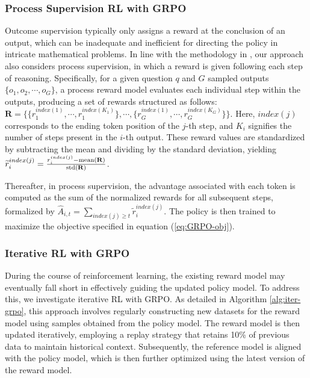 \begin{itemize}[topsep=0pt]
\begin{itemize}[topsep=0pt]
\subsubsection{Process Supervision RL with GRPO}

Outcome supervision typically only assigns a reward at the conclusion of an output, which can be inadequate and inefficient for directing the policy in intricate mathematical problems. In line with the methodology in \cite{wang2023math}, our approach also considers process supervision, in which a reward is given following each step of reasoning. Specifically, for a given question $q$ and $G$ sampled outputs $\{o_1, o_2, \cdots, o_G\}$, a process reward model evaluates each individual step within the outputs, producing a set of rewards structured as follows: $\mathbf{R} = \{ \{r_1^{index(1)},\cdots,r_1^{index(K_1)}\}, \cdots,  \{r_G^{index(1)},\cdots,r_G^{index(K_G)}\} \}$. Here, $index(j)$ corresponds to the ending token position of the $j$-th step, and $K_i$ signifies the number of steps present in the $i$-th output. These reward values are standardized by subtracting the mean and dividing by the standard deviation, yielding $\widetilde{r}_i^{index(j)} = \frac{r_i^{index(j)} - {\rm mean(\mathbf{R})}}{{\rm std(\mathbf{R})}}$.

Thereafter, in process supervision, the advantage associated with each token is computed as the sum of the normalized rewards for all subsequent steps, formalized by $\hat{A}_{i, t} = \sum_{index(j) \ge t} \widetilde{r}_i^{index(j)}$. The policy is then trained to maximize the objective specified in equation (\ref{eq:GRPO-obj}).

\subsubsection{Iterative RL with GRPO} During the course of reinforcement learning, the existing reward model may eventually fall short in effectively guiding the updated policy model. To address this, we investigate iterative RL with GRPO. As detailed in Algorithm \ref{alg:iter-grpo}, this approach involves regularly constructing new datasets for the reward model using samples obtained from the policy model. The reward model is then updated iteratively, employing a replay strategy that retains 10\% of previous data to maintain historical context. Subsequently, the reference model is aligned with the policy model, which is then further optimized using the latest version of the reward model.


\end{itemize}
\end{itemize}
